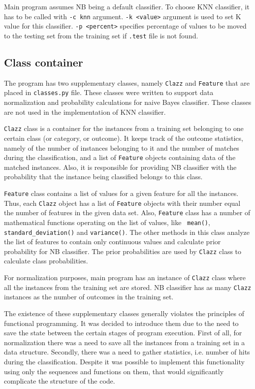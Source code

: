 \documentclass{llncs}
\begin{document}
Main program assumes NB being a default classifier. To choose KNN classifier, it has to be called with \lstinline{-c knn} argument. \lstinline{-k <value>} argument is used to set K value for this classifier. \lstinline{-p <percent>} specifies percentage of values to be moved to the testing set from the training set if \lstinline{.test} file is not found.

\subsection{Class container}

The program has two supplementary classes, namely \lstinline{Clazz} and \lstinline{Feature} that are placed in \lstinline{classes.py} file. These classes were written to support data normalization and probability calculations for naive Bayes classifier. These classes are not used in the implementation of KNN classifier.

\lstinline{Clazz} class is a container for the instances from a training set belonging to one certain class (or category, or outcome). It keeps track of the outcome statistics, namely of the number of instances belonging to it and the number of matches during the classification, and a list of \lstinline{Feature} objects containing data of the matched instances. Also, it is responsible for providing NB classifier with the probability that the instance being classified belongs to this class.

\lstinline{Feature} class contains a list of values for a given feature for all the instances. Thus, each \lstinline{Clazz} object has a list of \lstinline{Feature} objects with their number equal the number of features in the given data set. Also, \lstinline{Feature} class has a number of mathematical functions operating on the list of values, like ~\lstinline{mean()}, \lstinline{standard_deviation()} and \lstinline{variance()}. The other methods in this class analyze the list of features to contain only continuous values and calculate prior probability for NB classifier. The prior probabilities are used by \lstinline{Clazz} class to calculate class probabilities.

For normalization purposes, main program has an instance of \lstinline{Clazz} class where all the instances from the training set are stored. NB classifier has as many \lstinline{Clazz} instances as the number of outcomes in the training set.

The existence of these supplementary classes generally violates the principles of functional programming. It was decided to introduce them due to the need to save the state between the certain stages of program execution. First of all, for normalization there was a need to save all the instances from a training set in a data structure. Secondly, there was a need to gather statistics, i.e. number of hits during the classification. Despite it was possible to implement this functionality using only the sequences and functions on them, that would significantly complicate the structure of the code.
\end{document}
